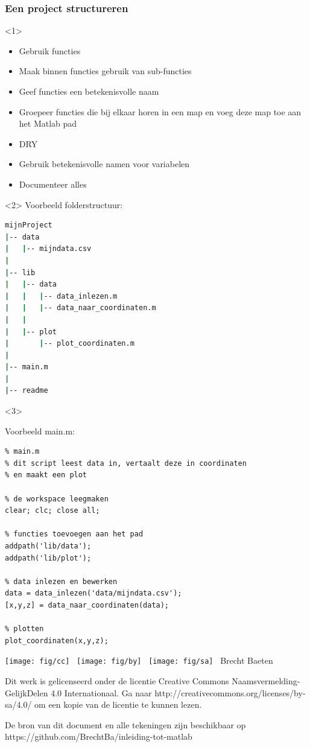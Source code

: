 \documentclass[t]{beamer}
\begin{document}
\begin{frame}[fragile]
	\frametitle{Een project structureren}
\begin{onlyenv}<1>
	\begin{itemize}
		\item Gebruik functies
		\item Maak binnen functies gebruik van sub-functies
		\item Geef functies een betekenisvolle naam
		\item Groepeer functies die bij elkaar horen in een map en voeg deze map toe aan het Matlab pad
		\item DRY
		\item Gebruik betekenisvolle namen voor variabelen
		\item Documenteer alles
	\end{itemize}
\end{onlyenv}
\begin{onlyenv}<2>
Voorbeeld folderstructuur:

	\begin{lstlisting}[language=bash]
mijnProject	
|-- data
|   |-- mijndata.csv
|
|-- lib
|   |-- data
|   |   |-- data_inlezen.m
|   |   |-- data_naar_coordinaten.m
|   |
|   |-- plot
|       |-- plot_coordinaten.m
|
|-- main.m
|
|-- readme
	\end{lstlisting}
\end{onlyenv}
\begin{onlyenv}<3>

Voorbeeld main.m:
	\begin{lstlisting}
% main.m
% dit script leest data in, vertaalt deze in coordinaten
% en maakt een plot

% de workspace leegmaken
clear; clc; close all;

% functies toevoegen aan het pad
addpath('lib/data');
addpath('lib/plot');

% data inlezen en bewerken
data = data_inlezen('data/mijndata.csv');
[x,y,z] = data_naar_coordinaten(data);

% plotten
plot_coordinaten(x,y,z);
	\end{lstlisting}	
	
\end{onlyenv}
\end{frame}
\begin{frame}
	\footnotesize
	\vspace{4cm}
	\texttt{[image: fig/cc]} \
	\texttt{[image: fig/by]} \
	\texttt{[image: fig/sa]}
	\quad \the\year\ Brecht Baeten
	\vspace{0.5cm}
	
    Dit werk is gelicenseerd onder de licentie Creative Commons Naamsvermelding-GelijkDelen 4.0 Internationaal. Ga naar http://creativecommons.org/licenses/by-sa/4.0/ om een kopie van de licentie te kunnen lezen.
    	
    \vspace{0.5cm}
    De bron van dit document en alle tekeningen zijn beschikbaar op https://github.com/BrechtBa/inleiding-tot-matlab
\end{frame}
\end{document}
